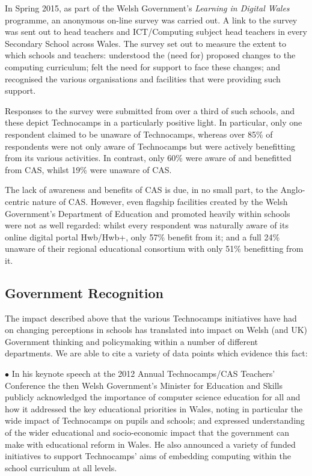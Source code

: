 \documentclass{sig-alternate}
\begin{document}
In Spring 2015, as part of the Welsh Government's
\emph{Learning in Digital Wales} programme,
an anonymous on-line survey was carried out.
A link to the survey %
was sent out to head teachers and ICT/Computing subject head teachers
in every Secondary School across Wales.
The survey set out to measure the extent to which schools and teachers:
understood the (need for) proposed changes to the computing curriculum;
felt the need for support to face these changes;
and recognised the various organisations and facilities that were
providing such support.

Responses to the survey were submitted from over a third of such schools,
and these depict Technocamps in a particularly positive light.
In particular, only one respondent claimed to be unaware of Technocamps,
whereas over 85\% of respondents were not only aware of Technocamps
but were actively benefitting from its various activities.
In contrast, only 60\% were aware of and benefitted from CAS,
whilst 19\% were unaware of CAS.

The lack of awareness and benefits of CAS is due, in no small part,
to the Anglo-centric nature of CAS.
However, even flagship facilities created by the Welsh Government's
Department of Education and promoted heavily within schools
were not as well regarded: whilst every respondent was naturally
aware of its online digital portal Hwb/Hwb+, only 57\% benefit from it;
and a full 24\% unaware of their regional educational consortium
with only 51\% benefitting from it.

\subsection{Government Recognition}\label{govrecog}

The impact described above that the various Technocamps initiatives
have had on changing perceptions in schools has translated into impact
on Welsh (and UK) Government thinking and policymaking within a number
of different departments. We are able to cite a variety of data points
which evidence this fact:
\vspace{1ex}

\noindent \textbf{$\bullet$}
In his keynote speech at the 2012 Annual Technocamps/CAS Teachers'
Conference %
the then Welsh Government's Minister for Education and Skills publicly
acknowledged the importance of computer science education for all and
how it addressed the key educational priorities in Wales, noting in particular
the wide impact of Technocamps on pupils and schools; and expressed 
understanding of the wider educational and socio-economic impact that
the government can make with educational reform in Wales. He also
announced a variety of funded initiatives to support Technocamps' aims
of embedding computing within the school curriculum at all levels.
\vspace{1ex}
\end{document}
